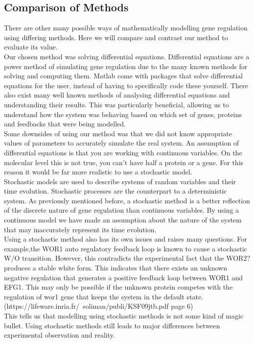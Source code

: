 \documentclass[]{article}
\begin{document}
\subsection{Comparison of Methods}
There are other many possible ways of mathematically modelling gene regulation using differing methods. Here we will compare and contrast our method to evaluate its value.
\\
Our chosen method was solving differential equations. Differential equations are a power method of simulating gene regulation due to the many known methods for solving and computing them. Matlab come with packages that solve differential equations for the user, instead of having to specifically code these yourself. There also exist many well known methods of analysing differential equations and understanding their results. This was particularly beneficial, allowing us to understand how the system was behaving based on which set of genes, proteins and feedbacks that were being modelled.
\\
Some downsides of using our method was that we did not know appropriate values of parameters to accurately simulate the real system. An assumption of differential equations is that you are working with continuous variables. On the molecular level this is not true, you can't have half a protein or a gene. For this reason it would be far more realistic to use a stochastic model. 
\\
Stochastic models are used to describe systems of random variables and their time evolution.  Stochastic processes are the counterpart to a deterministic system. As previously mentioned before, a stochastic method is a better reflection of the discrete nature of gene regulation than continuous variables. By using a continuous model we have made an assumption about the nature of the system that may inaccurately represent its time evolution.
\\
Using a stochastic method also has its own issues and raises many questions. For example,the WOR1 auto regulatory feedback loop is known to cause a stochastic W/O transition. However, this contradicts the experimental fact that the WOR2? produces a stable white form.  This indicates that there exists an unknown negative regulation that generates a positive feedback loop between WOR1 and EFG1. This may only be possible if the unknown protein competes with the regulation of wor1 gene that keeps the system in the default state. (https://lifeware.inria.fr/~soliman/publi/KSF09jtb.pdf page 6)
\\
This tells us that modelling using stochastic methods is not some kind of magic bullet. Using stochastic methods still leads to major differences between experimental observation and reality.
\end{document}
